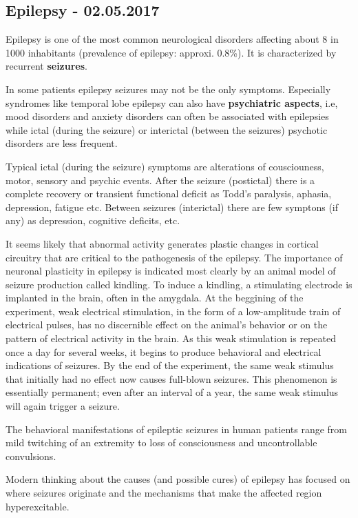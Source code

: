 \documentclass[12pt,article,oneside,a4paper]{memoir}
\begin{document}
\newpage
\subsection{Epilepsy - 02.05.2017}
Epilepsy is one of the most common neurological disorders affecting about 8 in
1000 inhabitants (prevalence of epilepsy: approxi. 0.8\%). It is characterized
by recurrent \textbf{seizures}.

In some patients epilepsy seizures may not be the only symptoms. Especially
syndromes like temporal lobe epilepsy can also have \textbf{psychiatric aspects},
i.e, mood disorders and anxiety disorders can often be associated with epilepsies
while ictal (during the seizure) or interictal (between the seizures) psychotic
disorders are less frequent.

Typical ictal (during the seizure) symptoms are alterations of cousciouness,
motor, sensory and psychic events. After the seizure (postictal) there is a
complete recovery or transient functional deficit as Todd's paralysis, aphasia,
depression, fatigue etc. Between seizures (interictal) there are few symptons
(if any) as depression, cognitive deficits, etc.

It seems likely that abnormal activity generates plastic changes in cortical
circuitry that are critical to the pathogenesis of the epilepsy. The importance
of neuronal plasticity in epilepsy is indicated most clearly by an animal model
of seizure production called kindling. To induce a kindling, a stimulating
electrode is implanted in the brain, often in the amygdala. At the beggining of
the experiment, weak electrical stimulation, in the form of a low-amplitude train
of electrical pulses, has no discernible effect on the animal’s behavior or on
the pattern of electrical activity in the brain. As this weak stimulation is
repeated once a day for several weeks, it begins to produce behavioral and
electrical indications of seizures. By the end of the experiment, the same weak
stimulus that initially had no effect now causes full-blown seizures. This
phenomenon is essentially permanent; even after an interval of a year, the same
weak stimulus will again trigger a seizure.

The behavioral manifestations of epileptic seizures in human patients range from
mild twitching of an extremity to loss of consciousness and uncontrollable
convulsions.

Modern thinking about the causes (and possible cures) of epilepsy has focused
on where seizures originate and the mechanisms that make the affected region
hyperexcitable. 
\end{document}
